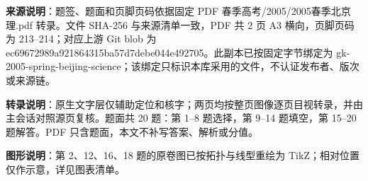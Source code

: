

\begin{gktip}
\textbf{来源说明}：题签、题面和页脚页码依据固定 PDF 春季高考/2005/2005春季北京理.pdf 转录。文件 SHA-256 与来源清单一致，PDF 共 2 页 A3 横向，页脚页码为 213–214；对应上游 Git blob 为 ec69672989a921864315ba57d7debe044e492705。此副本已按固定字节绑定为 gk-2005-spring-beijing-science；该绑定只标识本库采用的文件，不认证发布者、版次或来源链。

\textbf{转录说明}：原生文字层仅辅助定位和核字；两页均按整页图像逐页目视转录，并由主会话对照源页复核。题面共 20 题：第 1–8 题选择，第 9–14 题填空，第 15–20 题解答。PDF 只含题面，本文不补写答案、解析或分值。

\textbf{图形说明}：第 2、12、16、18 题的原卷图已按拓扑与线型重绘为 TikZ；相对位置仅作示意，详见图表清单。
\end{gktip}


